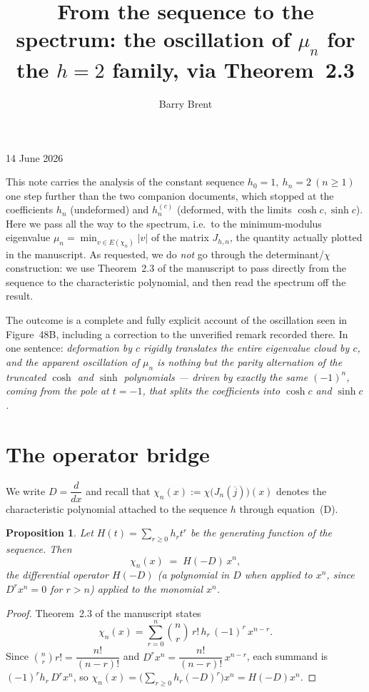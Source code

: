 \documentclass[11pt, fleqn]{amsart}
\title{From the sequence to the spectrum: the oscillation of $\mu_n$ for the
$h=2$ family, via Theorem~2.3}
\author{Barry Brent}
\newtheorem{proposition}[theorem]{Proposition}
\theoremstyle{remark}
\begin{document}
\maketitle
\vspace{-0.5em}
\begin{center}{14 June 2026}\end{center}
\vspace{1em}

This note carries the analysis of the constant sequence $h_0=1,\ h_n=2\ (n\ge1)$ one
step further than the two companion documents, which stopped at the coefficients $h_n$
(undeformed) and $h^{(c)}_n$ (deformed, with the limits $\cosh c,\sinh c$). Here we pass
all the way to the spectrum, i.e.\ to the minimum-modulus eigenvalue
$\mu_n=\min_{v\in E(\chi_n)}|v|$ of the matrix $J_{h,n}$, the quantity actually plotted in
the manuscript. As requested, we do \emph{not} go through the determinant/$\chi$
construction: we use Theorem~2.3 of the manuscript to pass directly from the sequence to
the characteristic polynomial, and then read the spectrum off the result.

The outcome is a complete and fully explicit account of the oscillation seen in
Figure~48B, including a correction to the unverified remark recorded there. In one
sentence: \emph{deformation by $c$ rigidly translates the entire eigenvalue cloud by $c$,
and the apparent oscillation of $\mu_n$ is nothing but the parity alternation of the
truncated $\cosh$ and $\sinh$ polynomials --- driven by exactly the same $(-1)^n$, coming
from the pole at $t=-1$, that splits the coefficients into $\cosh c$ and $\sinh c$.}

\section{The operator bridge}

We write $D=\dfrac{d}{dx}$ and recall that $\chi_n(x):=\chi\!\bigl(J_n(\overline{j})\bigr)(x)$
denotes the characteristic polynomial attached to the sequence $h$ through equation~(D).

\begin{proposition}\label{prop:bridge}
Let $H(t)=\sum_{r\ge0}h_r t^r$ be the generating function of the sequence. Then
\[
\chi_n(x)\;=\;H(-D)\,x^n ,
\]
the differential operator $H(-D)$ (a polynomial in $D$ when applied to $x^n$, since
$D^r x^n=0$ for $r>n$) applied to the monomial $x^n$.
\end{proposition}

\begin{proof}
Theorem~2.3 of the manuscript states
\[
\chi_n(x)=\sum_{r=0}^{n}\binom{n}{r}\,r!\,h_r\,(-1)^r\,x^{n-r}.
\]
Since $\binom{n}{r}r!=\dfrac{n!}{(n-r)!}$ and $D^r x^n=\dfrac{n!}{(n-r)!}\,x^{n-r}$, each
summand is $(-1)^r h_r\,D^r x^n$, so
$\chi_n(x)=\bigl(\sum_{r\ge0}h_r(-D)^r\bigr)x^n=H(-D)x^n$.
\end{proof}
\end{document}
